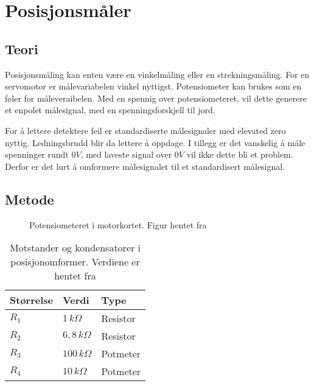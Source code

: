 \section{Posisjonsmåler}
\label{sec:pos_måler}

\subsection{Teori}



Posisjonsmåling kan enten være en vinkelmåling eller en strekningsmåling. For en servomotor er målevariabelen vinkel nyttigst. Potensiometer kan brukes som en føler for måleveraibelen. Med en spennig over potensiometeret, vil dette generere et enpolet målesignal, med en spenningsforskjell til jord.

For å lettere detektere feil er standardiserte målesignaler med elevated zero nyttig. Ledningsbrudd blir da lettere å oppdage. I tillegg er det vanskelig å måle spenninger rundt $0V$, med laveste signal over $0V$ vil ikke dette bli et problem. Derfor er det lurt å omformere målesignalet til et standardisert målesignal.

\subsection{Metode}

\begin{figure}[h]
    \centering
    
    \caption{Potensiometeret i motorkortet. Figur hentet fra \cite{AnalogMotorlabbOppgaver}}
    \label{fig:posisjon_maler_potmeter}
\end{figure}

\begin{table}[h]
    \centering
    \caption{Motstander og kondensatorer i posisjonomformer. Verdiene er hentet fra \cite{AnalogMotorlabbOppgaver}}
    \begin{tabular}{lll}
        \toprule
        Størrelse & Verdi & Type \\
		\midrule
        $R_1$ & $1\,k\Omega$ & Resistor\\
        $R_2$ & $6,8\,k\Omega$ & Resistor \\
        $R_3$ & $100\,k\Omega$ & Potmeter \\
        $R_4$ & $10\,k\Omega$ & Potmeter \\
        \bottomrule
    \end{tabular}
    \label{tab:Komponenter_i_posisjonsmaler}
\end{table}

